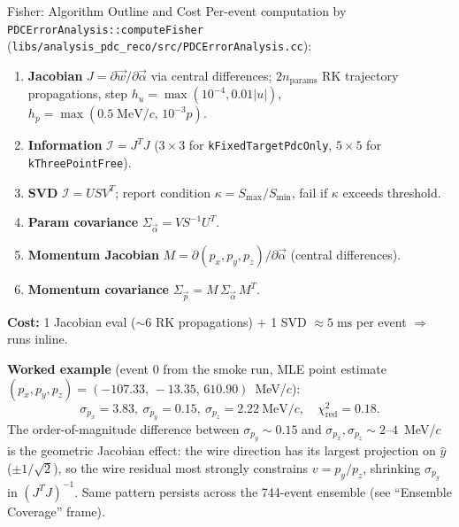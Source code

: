 \documentclass[aspectratio=169]{beamer}
\begin{document}
\begin{frame}{Fisher: Algorithm Outline and Cost}
\small
Per-event computation by \texttt{PDCErrorAnalysis::computeFisher} (\texttt{libs/analysis\_pdc\_reco/src/PDCErrorAnalysis.cc}):

\begin{enumerate}\setlength{\itemsep}{0pt}
\item \textbf{Jacobian} $J = \partial \vec{w}/\partial \vec{\alpha}$ via central differences;
$2 n_\mathrm{params}$ RK trajectory propagations, step
$h_u = \max(10^{-4}, 0.01|u|)$, $h_p = \max(0.5\;\mathrm{MeV}/c,\,10^{-3}p)$.
\item \textbf{Information} $\mathcal{I} = J^T J$ ($3{\times}3$ for \texttt{kFixedTargetPdcOnly}, $5{\times}5$ for \texttt{kThreePointFree}).
\item \textbf{SVD} $\mathcal{I} = U S V^T$; report condition $\kappa = S_\mathrm{max}/S_\mathrm{min}$, fail if $\kappa$ exceeds threshold.
\item \textbf{Param covariance} $\Sigma_{\vec{\alpha}} = V S^{-1} U^T$.
\item \textbf{Momentum Jacobian} $M = \partial(p_x,p_y,p_z)/\partial\vec{\alpha}$ (central differences).
\item \textbf{Momentum covariance} $\Sigma_{\vec{p}} = M\,\Sigma_{\vec{\alpha}}\,M^T$.
\end{enumerate}

\textbf{Cost:} 1 Jacobian eval ($\sim\!6$ RK propagations) + 1 SVD $\approx 5\;\mathrm{ms}$ per event $\Rightarrow$ runs inline.

\vspace{0.1cm}
\textbf{Worked example} (event 0 from the smoke run, MLE point estimate
$(p_x, p_y, p_z) = (-107.33,\, -13.35,\, 610.90)$~MeV/$c$):
\[
\sigma_{p_x} = 3.83,\ \sigma_{p_y} = 0.15,\ \sigma_{p_z} = 2.22\ \text{MeV}/c,\quad \chi^2_\mathrm{red} = 0.18.
\]
The order-of-magnitude difference between $\sigma_{p_y} \sim 0.15$ and $\sigma_{p_x},\sigma_{p_z} \sim 2\text{--}4$~MeV/$c$ is the geometric Jacobian effect: the wire direction has its largest projection on $\hat{y}$ ($\pm 1/\sqrt{2}$), so the wire residual most strongly constrains $v = p_y/p_z$, shrinking $\sigma_{p_y}$ in $(J^T J)^{-1}$. Same pattern persists across the 744-event ensemble (see ``Ensemble Coverage'' frame).
\end{frame}
\end{document}
